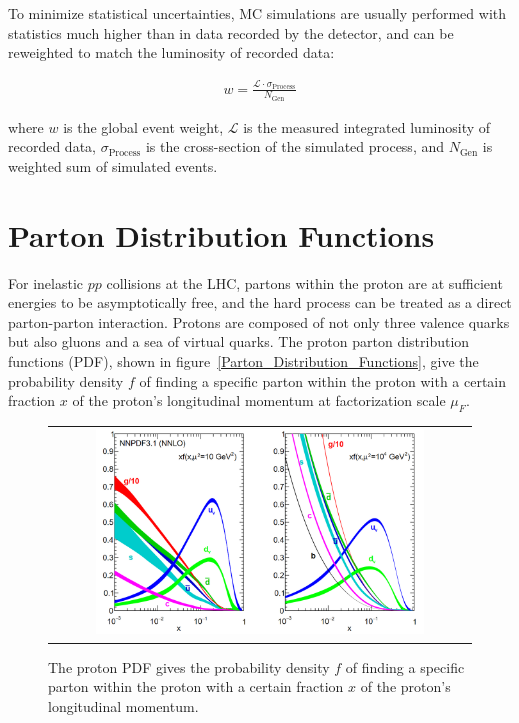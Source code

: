 \begin{refsection}
To minimize statistical uncertainties, MC simulations are usually performed with statistics much higher than in data recorded by the detector, and can be reweighted to match the luminosity of recorded data:
\begin{linenomath*}
\begin{align}
w = \frac{\mathcal{L} \cdot \sigma_{\text{Process}}}{N_{\text{Gen}}}
\end{align}
\end{linenomath*}
where $w$ is the global event weight, $\mathcal{L}$ is the measured integrated luminosity of recorded data, $\sigma_{\text{Process}}$ is the cross-section of the simulated process, and $N_{\text{Gen}}$ is weighted sum of simulated events.

\section{Parton Distribution Functions}
\label{sec:Parton_Distribution_Functions}
For inelastic $pp$ collisions at the LHC, partons within the proton are at sufficient energies to be asymptotically free, and the hard process can be treated as a direct parton-parton interaction.
Protons are composed of not only three valence quarks but also gluons and a sea of virtual quarks.
The proton parton distribution functions (PDF), shown in figure~\ref{Parton_Distribution_Functions}, give the probability density $f$ of finding a specific parton within the proton with a certain fraction $x$ of the proton's longitudinal momentum at factorization scale $\mu_F$.
\begin{figure}[htb]
  \begin{center}
    \begin{tabular}{c}
        \includegraphics[width=0.80\textwidth]{fig_Event_Simulation/Parton_Distribution_Functions.png}
    \end{tabular}
    \caption{The proton PDF gives the probability density $f$ of finding a specific parton within the proton with a certain fraction $x$ of the proton's longitudinal momentum.
}
\end{center}
\end{figure}
\end{refsection}
